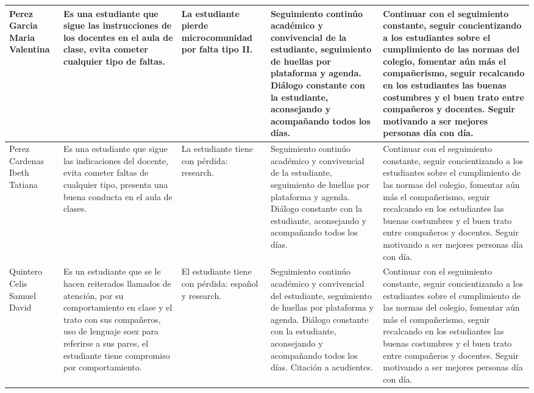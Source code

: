 \documentclass[spanish,11pt,a4paper]{article}
\begin{document}
\begin{longtable}{|p{3.5cm}|p{3.5cm}|p{3.5cm}|p{3.5cm}|p{3.5cm}|}
		Perez Garcia Maria Valentina & 
		Es una estudiante que sigue las instrucciones de los docentes en el aula de clase, evita cometer cualquier tipo de faltas.  & 
		La estudiante pierde microcomunidad por falta tipo II. & 
		Seguimiento continúo académico y convivencial de la estudiante, seguimiento de huellas por plataforma y agenda. Diálogo constante con la estudiante, aconsejando y acompañando todos los días. & 
		Continuar con el seguimiento constante, seguir concientizando a los estudiantes sobre el cumplimiento de las normas del colegio, fomentar aún más el compañerismo, seguir recalcando en los estudiantes las buenas costumbres y el buen trato entre compañeros y docentes. Seguir motivando a ser mejores personas día con día.\\
		\hline
		
		Perez Cardenas Ibeth Tatiana & 
		Es una estudiante que sigue las indicaciones del docente, evita cometer faltas de cualquier tipo, presenta una buena conducta en el aula de clases. & 
		La estudiante tiene con pérdida: research.	 & 
		Seguimiento continúo académico y convivencial de la estudiante, seguimiento de huellas por plataforma y agenda. Diálogo constante con la estudiante, aconsejando y acompañando todos los días. & 
		Continuar con el seguimiento constante, seguir concientizando a los estudiantes sobre el cumplimiento de las normas del colegio, fomentar aún más el compañerismo, seguir recalcando en los estudiantes las buenas costumbres y el buen trato entre compañeros y docentes. Seguir motivando a ser mejores personas día con día.\\
		\hline
		
		Quintero Celis Samuel David & 
		Es un estudiante que se le hacen reiterados llamados de atención, por su comportamiento en clase y el trato con sus compañeros, uso de lenguaje soez para referirse a sus pares, el estudiante tiene compromiso por comportamiento.  & 
		El estudiante tiene con pérdida: español y research. & 
		Seguimiento continúo académico y convivencial del estudiante, seguimiento de huellas por plataforma y agenda. Diálogo constante con la estudiante, aconsejando y acompañando todos los días. Citación a acudientes.& 
		Continuar con el seguimiento constante, seguir concientizando a los estudiantes sobre el cumplimiento de las normas del colegio, fomentar aún más el compañerismo, seguir recalcando en los estudiantes las buenas costumbres y el buen trato entre compañeros y docentes. Seguir motivando a ser mejores personas día con día.\\
		\hline
		

\end{longtable}
\end{document}
